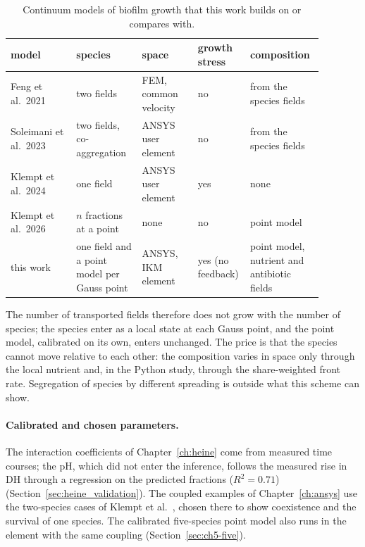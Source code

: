 \begin{table}[htbp]
  \centering
  \caption[Continuum models of biofilm growth compared]{Continuum models of
    biofilm growth that this work builds on or compares with.}
  \label{tab:concl_models}
  \small
  \begin{tabular}{@{}>{\raggedright\arraybackslash}p{0.2\linewidth}>{\raggedright\arraybackslash}p{0.2\linewidth}>{\raggedright\arraybackslash}p{0.17\linewidth}>{\raggedright\arraybackslash}p{0.1\linewidth}>{\raggedright\arraybackslash}p{0.21\linewidth}@{}}
    \toprule
    model & species & space & growth stress & composition\\
    \midrule
    Feng et al.\ 2021~\cite{Feng2021SymbioticBiofilm} & two fields & FEM, common velocity & no & from the species fields\\
    Soleimani et al.\ 2023~\cite{Soleimani2023CoAggregation} & two fields, co-aggregation & ANSYS user element & no & from the species fields\\
    Klempt et al.\ 2024~\cite{Klempt2024DiffusionDrivenGrowth} & one field & ANSYS user element & yes & none\\
    Klempt et al.\ 2026~\cite{Klempt2026ContinuumBacterialGrowth} & $n$ fractions at a point & none & no & point model\\
    this work & one field and a point model per Gauss point & ANSYS, IKM element & yes (no feedback) & point model, nutrient and antibiotic fields\\
    \bottomrule
  \end{tabular}
\end{table} The number of transported fields therefore does not grow with the
number of species; the species enter as a local state at each Gauss point, and
the point model, calibrated on its own, enters unchanged. The
price is that the species cannot move relative to each other: the
composition varies in space only through the local nutrient and, in the Python
study, through the share-weighted front rate. Segregation of species by
different spreading is outside what this scheme can show.

\paragraph{Calibrated and chosen parameters.} The interaction coefficients of
Chapter~\ref{ch:heine} come from measured time courses; the pH, which did not enter the inference, follows
the measured rise in DH through a regression on the predicted fractions
($R^2=0.71$)
(Section~\ref{sec:heine_validation}). The coupled examples of Chapter~\ref{ch:ansys} use the two-species
cases of Klempt et al.~\cite{Klempt2026ContinuumBacterialGrowth}, chosen there
to show coexistence and the survival of one species. The calibrated
five-species point model also runs in the element with the same coupling
(Section~\ref{sec:ch5-five}).

